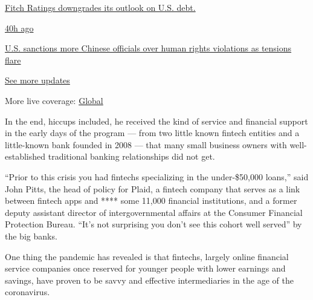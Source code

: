 \href{https://www.nytimes3xbfgragh.onion/live/2020/07/31/business/stock-market-today-coronavirus?action=click\&pgtype=Article\&state=default\&region=MAIN_CONTENT_1\&context=storylines_live_updates\#fitch-ratings-downgrades-its-outlook-on-us-debt}{Fitch
Ratings downgrades its outlook on U.S. debt.}

\href{https://www.nytimes3xbfgragh.onion/live/2020/07/31/business/stock-market-today-coronavirus?action=click\&pgtype=Article\&state=default\&region=MAIN_CONTENT_1\&context=storylines_live_updates\#us-sanctions-more-chinese-officials-over-human-rights-violations-as-tensions-flare}{40h
ago}

\href{https://www.nytimes3xbfgragh.onion/live/2020/07/31/business/stock-market-today-coronavirus?action=click\&pgtype=Article\&state=default\&region=MAIN_CONTENT_1\&context=storylines_live_updates\#us-sanctions-more-chinese-officials-over-human-rights-violations-as-tensions-flare}{U.S.
sanctions more Chinese officials over human rights violations as
tensions flare}

\href{https://www.nytimes3xbfgragh.onion/live/2020/07/31/business/stock-market-today-coronavirus?action=click\&pgtype=Article\&state=default\&region=MAIN_CONTENT_1\&context=storylines_live_updates}{See
more updates}

More live coverage:
\href{https://www.nytimes3xbfgragh.onion/2020/08/01/world/coronavirus-covid-19.html?action=click\&pgtype=Article\&state=default\&region=MAIN_CONTENT_1\&context=storylines_live_updates}{Global}

In the end, hiccups included, he received the kind of service and
financial support in the early days of the program --- from two little
known fintech entities and a little-known bank founded in 2008 --- that
many small business owners with well-established traditional banking
relationships did not get.

``Prior to this crisis you had fintechs specializing in the
under-\$50,000 loans,'' said John Pitts, the head of policy for Plaid, a
fintech company that serves as a link between fintech apps and **** some
11,000 financial institutions, and a former deputy assistant director of
intergovernmental affairs at the Consumer Financial Protection Bureau.
``It's not surprising you don't see this cohort well served'' by the big
banks.

One thing the pandemic has revealed is that fintechs, largely online
financial service companies once reserved for younger people with lower
earnings and savings, have proven to be savvy and effective
intermediaries in the age of the coronavirus.

